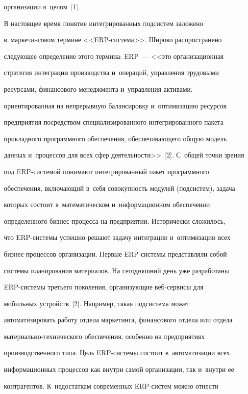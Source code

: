 организации в~целом~[1]. 

  

  В настоящее время понятие интегрированных подсистем заложено 

в~маркетинговом термине <<ERP-сис\-те\-ма>>. Широко распространено 

следующее определение этого термина: ERP~--- <<это организационная 

стратегия интеграции производства и~операций, управления трудовыми 

ресурсами, финансового менеджмента и~управления активами, 

ориентированная на непрерывную балансировку и~оптимизацию ресурсов 

предприятия посредством специализированного интегрированного пакета 

прикладного программного обеспечения, обес\-пе\-чи\-ва\-юще\-го общую модель 

данных и~процессов для всех сфер деятельности>>~[2]. С~общей точки зрения 

под ERP-сис\-те\-мой понимают интегрированный пакет программного 

обеспечения, включающий в~себя совокупность модулей (под\-сис\-тем), задача 

которых состоит в~математическом и~информационном обеспечении 

определенного биз\-нес-про\-цес\-са на предприятии. Исторически сложилось, 

что ERP-сис\-те\-мы успешно решают задачу интеграции и~оптимизации всех 

биз\-нес-про\-цес\-сов организации. Первые ERP-сис\-те\-мы представляли собой 

системы планирования материалов. На сегодняшний день уже разработаны 

ERP-сис\-те\-мы третьего поколения, организующие веб-сер\-ви\-сы для 

мобильных устройств~[2]. Например, такая подсистема может 

автоматизировать работу отдела маркетинга, финансового отдела или отдела 

ма\-те\-ри\-аль\-но-тех\-ни\-че\-ско\-го обеспечения, особенно на предприятиях 

производственного типа. Цель ERP-сис\-те\-мы состоит в~автоматизации всех 

информационных процессов как внутри самой организации, так и~внутри ее 

контрагентов. К~недостаткам современных ERP-сис\-тем можно от\-нес\-ти 

